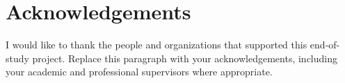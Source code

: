 \chapter*{Acknowledgements}

I would like to thank the people and organizations that supported this end-of-study project. Replace this paragraph with your acknowledgements, including your academic and professional supervisors where appropriate.

